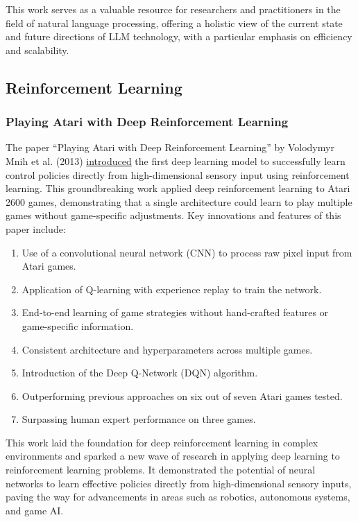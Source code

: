 \documentclass{article}
\begin{document}
This work serves as a valuable resource for researchers and practitioners in the field of natural language processing, offering a holistic view of the current state and future directions of LLM technology, with a particular emphasis on efficiency and scalability.

\subsection{Reinforcement Learning}

\subsubsection*{Playing Atari with Deep Reinforcement Learning}

The paper ``Playing Atari with Deep Reinforcement Learning'' by Volodymyr Mnih et al. (2013) \href{https://arxiv.org/abs/1312.5602}{introduced} the first deep learning model to successfully learn control policies directly from high-dimensional sensory input using reinforcement learning.\cite{Mnih2013} This groundbreaking work applied deep reinforcement learning to Atari 2600 games, demonstrating that a single architecture could learn to play multiple games without game-specific adjustments.
Key innovations and features of this paper include:
\begin{enumerate}
    \item Use of a convolutional neural network (CNN) to process raw pixel input from Atari games.
    \item Application of Q-learning with experience replay to train the network.
    \item End-to-end learning of game strategies without hand-crafted features or game-specific information.
    \item Consistent architecture and hyperparameters across multiple games.
    \item Introduction of the Deep Q-Network (DQN) algorithm.
    \item Outperforming previous approaches on six out of seven Atari games tested.
    \item Surpassing human expert performance on three games.
\end{enumerate}

This work laid the foundation for deep reinforcement learning in complex environments and sparked a new wave of research in applying deep learning to reinforcement learning problems. It demonstrated the potential of neural networks to learn effective policies directly from high-dimensional sensory inputs, paving the way for advancements in areas such as robotics, autonomous systems, and game AI.
\end{document}
